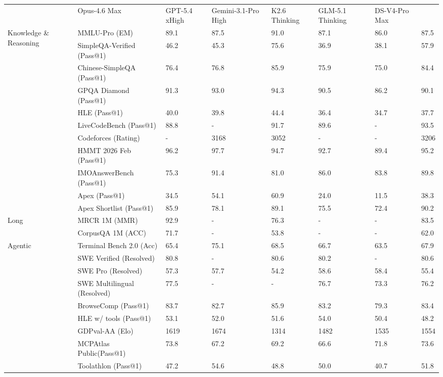 \documentclass[
  10
]{article}
\newcounter{none} %
\begin{document}
{\def\LTcaptype{none} %
\begin{longtable}[]{@{}llllllll@{}}
\toprule\noalign{}
\endhead
\bottomrule\noalign{}
\endlastfoot
\multicolumn{2}{@{}l}{%
Benchmark (Metric)} & Opus-4.6 Max & GPT-5.4 xHigh & Gemini-3.1-Pro High
& K2.6 Thinking & GLM-5.1 Thinking & DS-V4-Pro Max \\
\multirow{11}{*}{Knowledge \& Reasoning} & MMLU-Pro (EM) & 89.1 & 87.5 &
91.0 & 87.1 & 86.0 & 87.5 \\
& SimpleQA-Verified (Pass@1) & 46.2 & 45.3 & 75.6 & 36.9 & 38.1 &
57.9 \\
& Chinese-SimpleQA (Pass@1) & 76.4 & 76.8 & 85.9 & 75.9 & 75.0 & 84.4 \\
& GPQA Diamond (Pass@1) & 91.3 & 93.0 & 94.3 & 90.5 & 86.2 & 90.1 \\
& HLE (Pass@1) & 40.0 & 39.8 & 44.4 & 36.4 & 34.7 & 37.7 \\
& LiveCodeBench (Pass@1) & 88.8 & - & 91.7 & 89.6 & - & 93.5 \\
& Codeforces (Rating) & - & 3168 & 3052 & - & - & 3206 \\
& HMMT 2026 Feb (Pass@1) & 96.2 & 97.7 & 94.7 & 92.7 & 89.4 & 95.2 \\
& IMOAnswerBench (Pass@1) & 75.3 & 91.4 & 81.0 & 86.0 & 83.8 & 89.8 \\
& Apex (Pass@1) & 34.5 & 54.1 & 60.9 & 24.0 & 11.5 & 38.3 \\
& Apex Shortlist (Pass@1) & 85.9 & 78.1 & 89.1 & 75.5 & 72.4 & 90.2 \\
\multirow{2}{*}{Long} & MRCR 1M (MMR) & 92.9 & - & 76.3 & - & - &
83.5 \\
& CorpusQA 1M (ACC) & 71.7 & - & 53.8 & - & - & 62.0 \\
\multirow{9}{*}{Agentic} & Terminal Bench 2.0 (Acc) & 65.4 & 75.1 & 68.5
& 66.7 & 63.5 & 67.9 \\
& SWE Verified (Resolved) & 80.8 & - & 80.6 & 80.2 & - & 80.6 \\
& SWE Pro (Resolved) & 57.3 & 57.7 & 54.2 & 58.6 & 58.4 & 55.4 \\
& SWE Multilingual (Resolved) & 77.5 & - & - & 76.7 & 73.3 & 76.2 \\
& BrowseComp (Pass@1) & 83.7 & 82.7 & 85.9 & 83.2 & 79.3 & 83.4 \\
& HLE w/ tools (Pass@1) & 53.1 & 52.0 & 51.6 & 54.0 & 50.4 & 48.2 \\
& GDPval-AA (Elo) & 1619 & 1674 & 1314 & 1482 & 1535 & 1554 \\
& MCPAtlas Public(Pass@1) & 73.8 & 67.2 & 69.2 & 66.6 & 71.8 & 73.6 \\
& Toolathlon (Pass@1) & 47.2 & 54.6 & 48.8 & 50.0 & 40.7 & 51.8 \\
\end{longtable}
}
\end{document}
